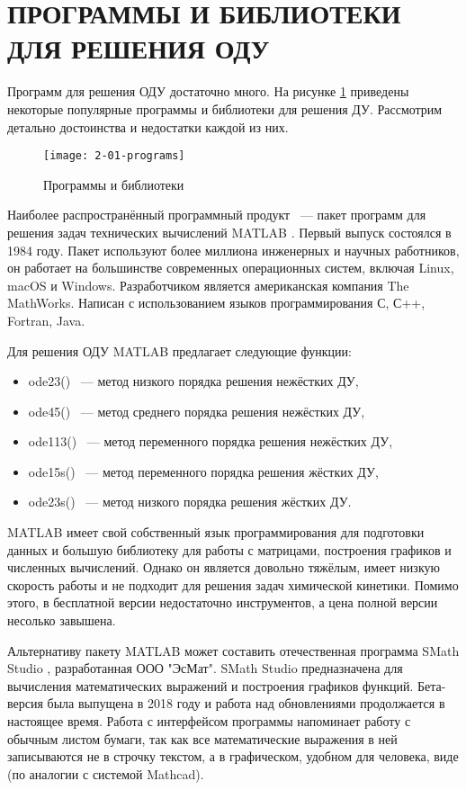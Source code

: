 \section{ПРОГРАММЫ И БИБЛИОТЕКИ ДЛЯ РЕШЕНИЯ ОДУ}

Программ для решения ОДУ достаточно много. На рисунке \ref{fig:programs} приведены
некоторые популярные программы и библиотеки для решения ДУ. Рассмотрим детально достоинства и недостатки каждой из них.

\begin{figure}
    \texttt{[image: 2-01-programs]}
    \caption{Программы и библиотеки}
    \label{fig:programs}
\end{figure}

Наиболее распространённый программный продукт ~--- пакет программ для решения задач технических вычислений MATLAB \cite{Wikipedia6, book10}. Первый выпуск
состоялся в 1984 году. Пакет используют
более миллиона инженерных и научных работников, он работает на большинстве современных операционных систем, включая Linux, macOS и
Windows. Разработчиком является американская компания The MathWorks. Написан с использованием языков программирования С, С++, Fortran,
Java.

Для решения ОДУ MATLAB предлагает следующие функции:

\begin{itemize}
    \item ode23() ~--- метод низкого порядка решения нежёстких ДУ,
    \item ode45() ~--- метод среднего порядка решения нежёстких ДУ,
    \item ode113() ~--- метод переменного порядка решения нежёстких ДУ,
    \item ode15s() ~--- метод переменного порядка решения жёстких ДУ,
    \item ode23s() ~--- метод низкого порядка решения жёстких ДУ.
\end{itemize}

MATLAB имеет свой собственный язык программирования для подготовки данных и большую библиотеку для работы с матрицами, построения
графиков и численных вычислений. Однако он является довольно тяжёлым, имеет низкую скорость работы и не
подходит для решения задач химической кинетики. Помимо этого, в бесплатной версии недостаточно инструментов, а цена полной версии
несолько завышена.

Альтернативу пакету MATLAB может составить отечественная программа SMath Studio \cite{Wikipedia7}, разработанная ООО "ЭсМат".
SMath Studio предназначена для вычисления математических выражений и построения графиков функций. Бета-версия была выпущена в 2018
году и работа над обновлениями продолжается в настоящее время. Работа с интерфейсом
программы напоминает работу с обычным листом бумаги, так как все математические выражения в ней записываются не в строчку текстом,
а в графическом, удобном для человека, виде (по аналогии с системой Mathcad).

